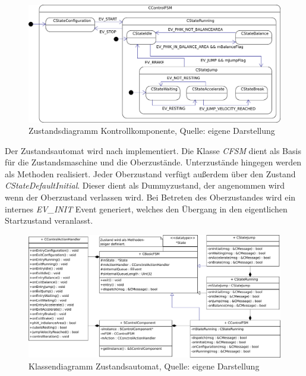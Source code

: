 \documentclass{article}
\begin{document}
\begin{figure}[h]
	\includegraphics[width=\linewidth]{KontrollFSM}
	\caption{Zustandsdiagramm Kontrollkomponente, Quelle: eigene Darstellung}
\end{figure}

\newpage
Der Zustandsautomat wird nach \cite{WieTra} implementiert. Die Klasse  \textit{CFSM} dient als Basis für die Zustandsmaschine und die Oberzustände. Unterzustände hingegen werden als Methoden realisiert. Jeder Oberzustand verfügt außerdem über den Zustand \textit{CStateDefaultInitial}. Dieser dient als Dummyzustand, der angenommen wird wenn der Oberzustand verlassen wird. Bei Betreten des Oberzustandes wird ein internes \textit{EV\_INIT} Event generiert, welches den Übergang in den eigentlichen Startzustand veranlasst.

\begin{figure}[h]
	\includegraphics[width=\linewidth]{KontrollFSMKlassendiagra}
	\caption{Klassendiagramm Zustandsautomat, Quelle: eigene Darstellung}
\end{figure}
\end{document}
